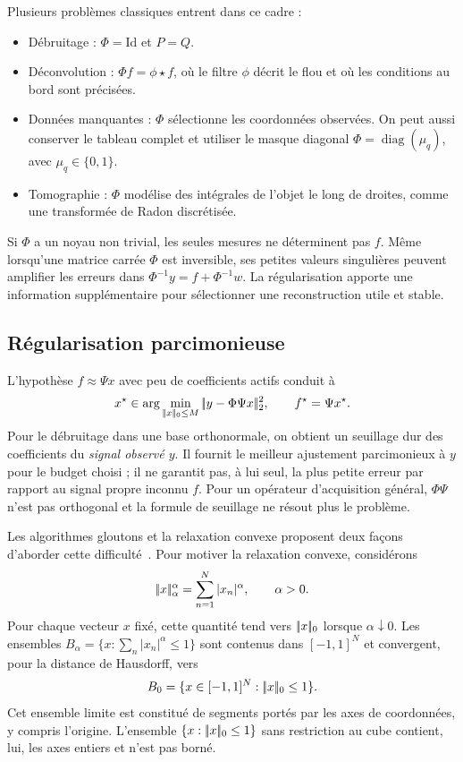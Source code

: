Plusieurs problèmes classiques entrent dans ce cadre :
\begin{itemize}
\item Débruitage : $\Phi=\mathrm{Id}$ et $P=Q$.
\item Déconvolution : $\Phi f=\phi\star f$, où le filtre $\phi$ décrit le flou et où les conditions au bord sont précisées.
\item Données manquantes : $\Phi$ sélectionne les coordonnées observées. On peut aussi conserver le tableau complet et utiliser le masque diagonal $\Phi=\operatorname{diag}(\mu_q)$, avec $\mu_q\in\{0,1\}$.
\item Tomographie : $\Phi$ modélise des intégrales de l'objet le long de droites, comme une transformée de Radon discrétisée.
\end{itemize}
Si $\Phi$ a un noyau non trivial, les seules mesures ne déterminent pas $f$. Même lorsqu'une matrice carrée $\Phi$ est inversible, ses petites valeurs singulières peuvent amplifier les erreurs dans $\Phi^{-1}y=f+\Phi^{-1}w$. La régularisation apporte une information supplémentaire pour sélectionner une reconstruction utile et stable.

\subsection{Régularisation parcimonieuse}
L'hypothèse $f\approx\Psi x$ avec peu de coefficients actifs conduit à
\begin{equation}\label{eq-pbm-l0}
 x^\star\in\arg\min_{|\!| x |\!|_0\le M}|\!| y-\Phi\Psi x |\!|_2^2,
 \qquad f^\star=\Psi x^\star.
\end{equation}
Pour le débruitage dans une base orthonormale, on obtient un seuillage dur des coefficients du \emph{signal observé $y$}. Il fournit le meilleur ajustement parcimonieux à $y$ pour le budget choisi ; il ne garantit pas, à lui seul, la plus petite erreur par rapport au signal propre inconnu $f$. Pour un opérateur d'acquisition général, $\Phi\Psi$ n'est pas orthogonal et la formule de seuillage ne résout plus le problème.

Les algorithmes gloutons et la relaxation convexe proposent deux façons d'aborder cette difficulté~\cite{MallatMP,2014-vaiter-ps-review}. Pour motiver la relaxation convexe, considérons
\[
 |\!| x |\!|_\alpha^\alpha=\sum_{n=1}^N|x_n|^\alpha,\qquad \alpha>0.
\]
Pour chaque vecteur $x$ fixé, cette quantité tend vers $|\!| x |\!|_0$ lorsque $\alpha\downarrow0$. Les ensembles $B_\alpha=\{x:\sum_n|x_n|^\alpha\le1\}$ sont contenus dans $[-1,1]^N$ et convergent, pour la distance de Hausdorff, vers
\[
 B_0=\{x\in[-1,1]^N:|\!| x |\!|_0\le1\}.
\]
Cet ensemble limite est constitué de segments portés par les axes de coordonnées, y compris l'origine. L'ensemble $\{x:|\!| x |\!|_0\le1\}$ sans restriction au cube contient, lui, les axes entiers et n'est pas borné.

